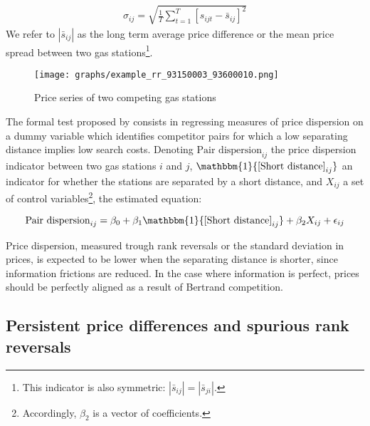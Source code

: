 \documentclass[english]{article}
\begin{document}
\begin{align*}
\sigma_{ij} = \sqrt{\frac{1}{T} \sum_{t=1}^{T} [s_{ijt} - \bar{s}_{ij}]^2}
\end{align*}
We refer to $|\bar{s}_{ij}|$ as the long term average price difference or the mean price spread between two gas stations\footnote{This indicator is also symmetric: $|\bar{s}_{ij}| = |\bar{s}_{ji}|$.}.

\begin{figure}[htb!]
    \caption{Price series of two competing gas stations}
	\centering
		\texttt{[image: graphs/example\_rr\_93150003\_93600010.png]}
\label{fig:rr_pair_example}
\end{figure}

The formal test proposed by \cite{CHA11} consists in regressing measures of price dispersion on a dummy variable which identifies competitor pairs for which a low separating distance implies low search costs. Denoting $\text{Pair dispersion}_{ij}$ the price dispersion indicator between two gas stations $i$ and $j$, $\mathbbm{1}{\text{[Short distance]}_{ij}}$ an indicator for whether the stations are separated by a short distance, and $X_{ij}$ a set of control variables\footnote{Accordingly, $\beta_2$ is a vector of coefficients.}, the estimated equation:

\begin{equation}
\text{Pair dispersion}_{ij}= \beta_0 + \beta_1 \mathbbm{1}{\text{[Short distance]}_{ij}} + \beta_2 X_{ij} + \epsilon_{ij}
\end{equation}

Price dispersion, measured trough rank reversals or the standard deviation in prices, is expected to be lower when the separating distance is shorter, since information frictions are reduced. In the case where information is perfect, prices should be perfectly aligned as a result of Bertrand competition.

\subsection{Persistent price differences and spurious rank reversals}
\end{document}

